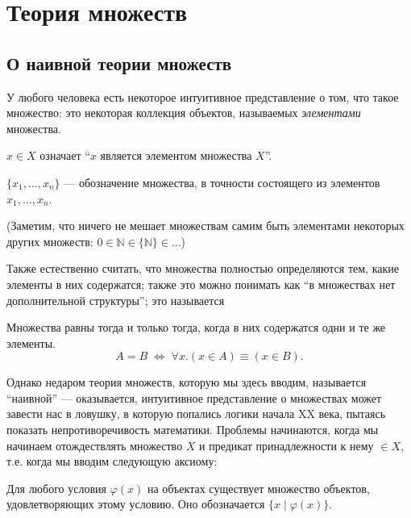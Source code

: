\chapter{Теория множеств}

\section{О наивной теории множеств}

У любого человека есть некоторое интуитивное представление о том, что такое
множество: это некоторая коллекция объектов, называемых \textit{элементами}
множества.

\begin{defn}
  $x \in X$ означает ``$x$ является элементом множества $X$''.
\end{defn}
\begin{defn}
  $\{x_1,\ldots,x_n\}$ --- обозначение множества, в точности состоящего из
  элементов $x_1,\ldots,x_n$.
\end{defn}

(Заметим, что ничего не мешает множествам самим быть элементами некоторых других
множеств: $0\in\mathbb{N}\in\{\mathbb{N}\}\in\ldots$)

Также естественно считать, что множества полностью определяются тем, какие
элементы в них содержатся; также это можно понимать как ``в множествах нет
дополнительной структуры''; это называется

\begin{ax}
  Множества равны тогда и только тогда, когда в них содержатся одни и те же
  элементы.
  \[
    A=B\;\Longleftrightarrow\;\forall x.(x\in A)\equiv(x\in B).
  \]
\end{ax}

Однако недаром теория множеств, которую мы здесь вводим, называется ``наивной''
--- оказывается, интуитивное представление о множествах может завести нас в
ловушку, в которую попались логики начала XX века, пытаясь показать
непротиворечивость математики. Проблемы начинаются, когда мы начинаем
отождествлять множество $X$ и предикат принадлежности к нему $\in X$, т.е. когда
мы вводим следующую аксиому:

\begin{ax*}
  Для любого условия $\varphi(x)$ на объектах существует множество объектов,
  удовлетворяющих этому условию. Оно обозначается $\{x\;|\;\varphi(x)\}$.
\end{ax*}

